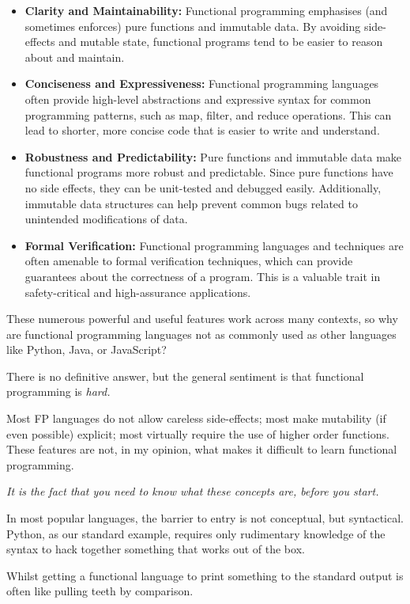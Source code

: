 \documentclass{l4proj}
\begin{document}
\begin{itemize}
    \item \textbf{Clarity and Maintainability:} Functional programming emphasises (and sometimes enforces) pure functions and immutable data.
    By avoiding side-effects and mutable state, functional programs tend to be easier to reason about and maintain.
    \item \textbf{Conciseness and Expressiveness:} Functional programming languages often provide high-level abstractions and expressive syntax for common programming patterns, such as map, filter, and reduce operations.
    This can lead to shorter, more concise code that is easier to write and understand.
    \item \textbf{Robustness and Predictability:} Pure functions and immutable data make functional programs more robust and predictable.
    Since pure functions have no side effects, they can be unit-tested and debugged easily.
    Additionally, immutable data structures can help prevent common bugs related to unintended modifications of data.
    \item \textbf{Formal Verification:} Functional programming languages and techniques are often amenable to formal verification techniques, which can provide guarantees about the correctness of a program.
    This is a valuable trait in safety-critical and high-assurance applications.
\end{itemize}

These numerous powerful and useful features work across many contexts, so why are functional programming languages not as commonly used as other languages like Python, Java, or JavaScript?

There is no definitive answer, but the general sentiment is that functional programming is \emph{hard.}

Most FP languages do not allow careless side-effects; most make mutability (if even possible) explicit; most virtually require the use of higher order functions. 
These features are not, in my opinion, what makes it difficult to learn functional programming. 

\emph{It is the fact that you need to know what these concepts are, before you start.}

In most popular languages, the barrier to entry is not conceptual, but syntactical.
Python, as our standard example, requires only rudimentary knowledge of the syntax to hack together something that works out of the box.

Whilst getting a functional language to print something to the standard output is often like pulling teeth by comparison.
\newpage
\end{document}
